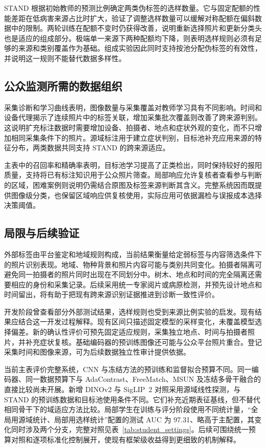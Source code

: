\documentclass[11pt,a4paper,UTF8,fontset=windows,scheme=plain]{ctexart}
\begin{document}
STAND 根据初始教师的预测比例确定两类伪标签的选样数量。它与固定配额的性能差距在低病害来源占比时扩大，验证了调整选样数量可以缓解对称配额在偏斜数据中的限制。两轮训练在配额不变时仍获得改善，说明重新选择照片和更新分类头也是适应的组成部分。极端单一来源下两种配额均下降，则表明选样规则必须有足够的来源和类别覆盖作为基础。组成实验因此同时支持按池分配伪标签的有效性，并说明这一规则不能替代数据多样性。

\subsection{公众监测所需的数据组织}
采集诊断和学习曲线表明，图像数量与采集覆盖对教师学习具有不同影响。时间和设备代理揭示了连续照片中的标签关联，增加采集批次覆盖则改善了跨来源判别。这说明扩充标注数据时需要增加设备、拍摄者、地点和症状外观的变化，而不只增加相同采集条件下的照片。源域标注用于建立症状判别，目标池补充应用来源的特征分布，两类数据共同支持 STAND 的跨来源适应。

主表中的召回率和精确率表明，目标池学习提高了正类检出，同时保持较好的报阳质量，支持将已有标注知识用于公众照片筛查。局部响应允许复核者查看参与判断的区域，困难案例则说明仍需结合原图及标签来源判断其含义。完整系统因而既提供图像级分类，也保留区域响应供复核使用，实际应用可依据漏检与误报成本选择决策阈值。

\subsection{局限与后续验证}
外部标签由平台鉴定和地域规则构成，当前结果衡量给定弱标签与内容筛选条件下的照片识别表现。地域、物种背景和照片内容可能与类别共同变化。拍摄者隔离可避免同一拍摄者的照片同时出现在不同划分中。树木、地点和时间的完全隔离还需要相应的身份和采集记录。后续采用统一专家阅片或病原检测，并预先设计地点和时间留出，将有助于把现有跨来源识别证据推进到诊断一致性评价。

开发阶段曾查看部分外部测试结果，选样规则也受到来源比例实验的启发。现有结果应结合这一开发过程解释。现有区间只描述固定模型的采样变化，未覆盖模型选择偏差。新的确认性评价可预先固定适应规则，采集独立地点、时间与拍摄者照片，并补充症状复核。基础编码器的预训练图像还可能与公众平台照片重合。登记采集时间和图像来源，可为后续数据独立性审计提供依据。

当前主表评价完整系统，CNN 与冻结方法的预训练和监督拟合预算不同。同一编码器、同一数据预算下与 AdaContrast、FreeMatch、MSUN 及冻结多骨干融合的直接比较尚未开展。新增 DINOv2 与 SigLIP~2 对照采用源域线性探测，与 STAND 的预训练数据和目标池使用条件不同。它们补充近期表征基线，但不替代相同骨干下的域适应方法比较。局部学生在训练与评分阶段使用不同统计量，“全局用源域统计、局部用选样统计”配置的测试 AUC 为 97.31、略高于主配置，其变化同时涉及两个分支，完整对照见表~\ref{tab:student_settings}。后续可围绕统一预算对照和逐项标准化控制展开，使现有框架级收益得到更细致的机制解释。
\end{document}
